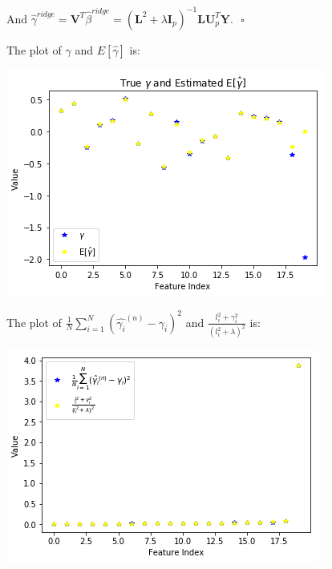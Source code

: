 \documentclass[paper=letter, fontsize=12pt]{article}
\begin{document}
\begin{enumerate}[label=(\alph*)]
	And $\hat{\gamma}^{ridge} = \mathbf{V}^{T} \hat{\beta}^{ridge} = (\mathbf{L}^2 + \lambda \mathbf{I}_{p})^{-1} \mathbf{L} \mathbf{U}^{T}_{p} \mathbf{Y}. \ \ \ \square$
	
	The plot of $\gamma$ and $E[\hat{\gamma}]$ is:
	
	\includegraphics[scale=0.6]{q3c1.png}
	
	The plot of $\frac{1}{N}\sum_{i=1}^{N}(\hat{\gamma_i}^{(n)} - \gamma_i)^2$ and $\frac{l_i^2 + \gamma_i^2}{(l_i^2 + \lambda)^2}$ is:
	
	\includegraphics[scale=0.6]{q3c2.png}
\end{enumerate}
\end{document}

